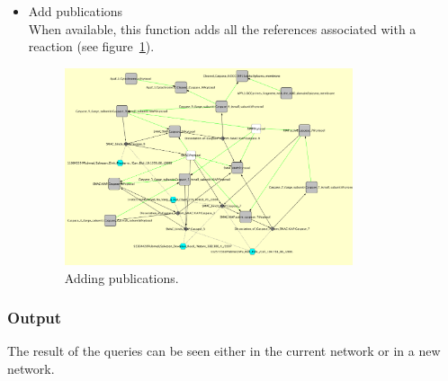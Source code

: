 \begin{itemize}
\begin{itemize}
\end{itemize}
\item Add publications\\
When available, this function adds all the references associated with a reaction (see figure~\ref{Standard_Query_Adding_publications}).

\begin{figure}
\centering
\includegraphics[width=0.8\textwidth]{graphics/ebo_smac_publications}
\caption{Adding publications.}
\label{Standard_Query_Adding_publications}
\end{figure}

\end{itemize}

\subsubsection{Output}
The result of the queries can be seen either in the current network or in a new network.

